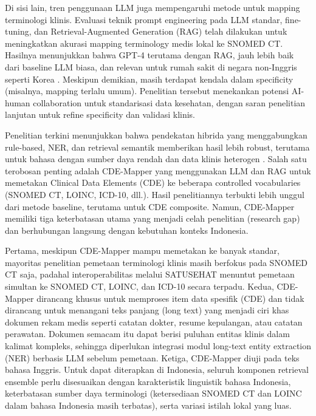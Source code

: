 Di sisi lain, tren penggunaan LLM juga mempengaruhi metode untuk mapping terminologi klinis. Evaluasi teknik prompt engineering pada LLM standar, fine-tuning, dan Retrieval-Augmented Generation (RAG) telah dilakukan untuk meningkatkan akurasi mapping terminology medis lokal ke SNOMED CT. Hasilnya menunjukkan bahwa GPT-4 terutama dengan RAG, jauh lebih baik dari baseline LLM biasa, dan relevan untuk rumah sakit di negara non-Inggris seperti Korea \citep{huh_comparative_2025}. Meskipun demikian, masih terdapat kendala dalam specificity (misalnya, mapping terlalu umum). Penelitian tersebut menekankan potensi AI-human collaboration untuk standarisasi data kesehatan, dengan saran penelitian lanjutan untuk refine specificity dan validasi klinis.

Penelitian terkini menunjukkan bahwa pendekatan hibrida yang menggabungkan rule-based, NER, dan retrieval semantik memberikan hasil lebih robust, terutama untuk bahasa dengan sumber daya rendah dan data klinis heterogen \citep{chen_clinical_2020,gilani_cde-mapper_2025,pezoulas_hybrid_2021}. Salah satu terobosan penting adalah CDE-Mapper \citep{gilani_cde-mapper_2025} yang menggunakan LLM dan RAG untuk memetakan Clinical Data Elements (CDE) ke beberapa controlled vocabularies (SNOMED CT, LOINC, ICD-10, dll.). Hasil penelitiannya terbukti lebih unggul dari metode baseline, terutama untuk CDE composite. Namun, CDE-Mapper memiliki tiga keterbatasan utama yang menjadi celah penelitian (research gap) dan berhubungan langsung dengan kebutuhan konteks Indonesia.

Pertama, meskipun CDE-Mapper mampu memetakan ke banyak standar, mayoritas penelitian pemetaan terminologi klinis masih berfokus pada SNOMED CT saja, padahal interoperabilitas melalui SATUSEHAT menuntut pemetaan simultan ke SNOMED CT, LOINC, dan ICD-10 secara terpadu. Kedua, CDE-Mapper dirancang khusus untuk memproses item data spesifik (CDE) dan tidak dirancang untuk menangani teks panjang (long text) yang menjadi ciri khas dokumen rekam medis seperti catatan dokter, resume kepulangan, atau catatan perawatan. Dokumen semacam itu dapat berisi puluhan entitas klinis dalam kalimat kompleks, sehingga diperlukan integrasi modul long-text entity extraction (NER) berbasis LLM sebelum pemetaan. Ketiga, CDE-Mapper diuji pada teks bahasa Inggris. Untuk dapat diterapkan di Indonesia, seluruh komponen retrieval ensemble perlu disesuaikan dengan karakteristik linguistik bahasa Indonesia, keterbatasan sumber daya terminologi (ketersediaan SNOMED CT dan LOINC dalam bahasa Indonesia masih terbatas), serta variasi istilah lokal yang luas.

